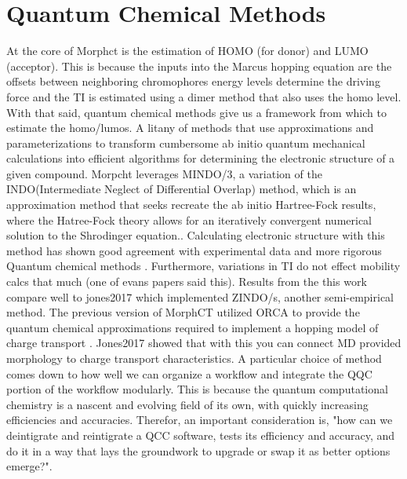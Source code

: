 \section{Quantum Chemical Methods}
At the core of Morphct is the estimation of HOMO (for donor) and LUMO (acceptor). This is because 
the inputs into the Marcus hopping equation are the offsets between neighboring  chromophores energy levels
determine the driving force and the TI is estimated using a dimer method that also uses the homo level. 
With that said, quantum chemical methods give us a framework from which to estimate the homo/lumos. A litany of
methods that use approximations and parameterizations to transform cumbersome ab initio quantum mechanical 
calculations into efficient algorithms for determining the electronic structure of a given compound. Morpcht 
leverages MINDO/3, a variation of the INDO(Intermediate Neglect of Differential Overlap) method,
which is an approximation method that seeks recreate the ab initio Hartree-Fock
results, where the Hatree-Fock theory allows for an iteratively convergent numerical solution to the Shrodinger equation.\cite{Thiel2014}. Calculating electronic structure with this method has
shown good agreement with experimental data and more rigorous Quantum chemical
methods 
\cite{Bredas2002}. Furthermore, variations in TI do not effect mobility calcs
that much (one of evans papers said this).  Results
from the this work compare well to jones2017 which implemented ZINDO/s, another
semi-empirical method. The
previous version of MorphCT utilized ORCA to provide the quantum chemical
approximations required to implement
a hopping model of charge transport \cite{Neese2012b}. Jones2017 showed that with this you can connect MD
provided morphology to charge transport characteristics. A particular 
choice of method comes down to how well we can organize a workflow and integrate the QQC portion of the
workflow modularly. This is because the quantum computational chemistry is a nascent and evolving field of its
own, with quickly increasing efficiencies and accuracies. Therefor, an important consideration is, "how can we
deintigrate and reintigrate a QCC software, tests its efficiency and accuracy, and do it in a way that lays
the groundwork to upgrade or swap it as better options emerge?". 

